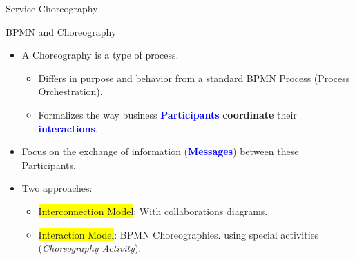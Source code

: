 \documentclass[xcolor=svgnames]{beamer}
\begin{document}
\begin{frame}{Service Choreography}
{          }
    \end{frame}





  \begin{frame}{BPMN and Choreography}
    \begin{itemize}
      \item <1-> A Choreography is a type of process.
	\begin{itemize}
	  \item Differs in purpose and behavior from a standard BPMN Process (Process Orchestration).
	  \item Formalizes the way business \textcolor{blue}{\textbf{Participants}} \textbf{coordinate} their \textcolor{blue}{\textbf{interactions}}.
	\end{itemize}
      \item <2-> Focus on the exchange of information (\textcolor{blue}{\textbf{Messages}}) between these Participants.
      \item <3-> Two approaches:
	\begin{itemize}
	  \item <4-> \colorbox{yellow}{Interconnection Model}: With collaborations diagrams.
	  \item <5-> \colorbox{yellow}{Interaction Model}:  BPMN Choreographies. using special activities (\textit{Choreography Activity}).
	\end{itemize}
    \end{itemize}

  \end{frame}
\end{document}
